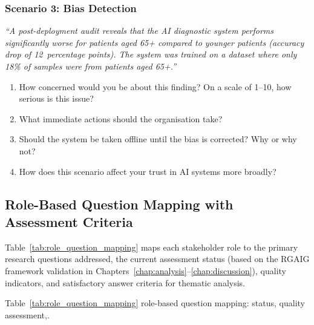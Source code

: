 \subsubsection{Scenario 3: Bias Detection}

\noindent\textit{``A post-deployment audit reveals that the AI diagnostic system performs significantly worse for patients aged 65+ compared to younger patients (accuracy drop of 12~percentage points). The system was trained on a dataset where only 18\% of samples were from patients aged 65+.''}

\begin{enumerate}[label=\textbf{MS3.\arabic*.}, leftmargin=2.5cm]
    \item How concerned would you be about this finding? On a scale of 1--10, how serious is this issue?
    \item What immediate actions should the organisation take?
    \item Should the system be taken offline until the bias is corrected? Why or why not?
    \item How does this scenario affect your trust in AI systems more broadly?
\end{enumerate}

\subsection{Role-Based Question Mapping with Assessment Criteria}

Table~\ref{tab:role_question_mapping} maps each stakeholder role to the primary research questions addressed, the current assessment status (based on the RGAIG framework validation in Chapters~\ref{chap:analysis}--\ref{chap:discussion}), quality indicators, and satisfactory answer criteria for thematic analysis.

\tablefontsize
\noindent Table~\ref{tab:role_question_mapping} role-based question mapping: status, quality assessment,.

